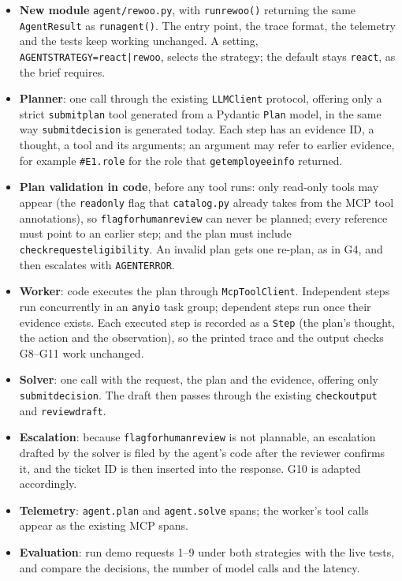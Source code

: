 \documentclass[11pt,letterpaper]{article}
\renewcommand{\_}{\textunderscore\allowbreak}
\begin{document}
\begin{itemize}
  \item \textbf{New module} \texttt{agent/rewoo.py}, with \texttt{run\_rewoo()} returning the same
  \texttt{AgentResult} as \texttt{run\_agent()}. The entry point, the trace format, the telemetry
  and the tests keep working unchanged. A setting, \texttt{AGENT\_STRATEGY=react|rewoo}, selects
  the strategy; the default stays \texttt{react}, as the brief requires.
  \item \textbf{Planner}: one call through the existing \texttt{LLMClient} protocol, offering only
  a strict \texttt{submit\_plan} tool generated from a Pydantic \texttt{Plan} model, in the same way
  \texttt{submit\_decision} is generated today. Each step has an evidence ID, a thought, a tool
  and its arguments; an argument may refer to earlier evidence, for example
  \texttt{\#E1.role} for the role that \texttt{get\_employee\_info} returned.
  \item \textbf{Plan validation in code}, before any tool runs: only read-only tools may appear
  (the \texttt{read\_only} flag that \texttt{catalog.py} already takes from the MCP tool
  annotations), so \texttt{flag\_for\_human\_review} can never be planned; every reference must
  point to an earlier step; and the plan must include \texttt{check\_request\_eligibility}. An
  invalid plan gets one re-plan, as in G4, and then escalates with \texttt{AGENT\_ERROR}.
  \item \textbf{Worker}: code executes the plan through \texttt{McpToolClient}. Independent steps
  run concurrently in an \texttt{anyio} task group; dependent steps run once their evidence
  exists. Each executed step is recorded as a \texttt{Step} (the plan's thought, the action and
  the observation), so the printed trace and the output checks G8--G11 work unchanged.
  \item \textbf{Solver}: one call with the request, the plan and the evidence, offering only
  \texttt{submit\_decision}. The draft then passes through the existing \texttt{check\_output}
  and \texttt{review\_draft}.
  \item \textbf{Escalation}: because \texttt{flag\_for\_human\_review} is not plannable, an
  escalation drafted by the solver is filed by the agent's code after the reviewer confirms it,
  and the ticket ID is then inserted into the response. G10 is adapted accordingly.
  \item \textbf{Telemetry}: \texttt{agent.plan} and \texttt{agent.solve} spans; the worker's tool
  calls appear as the existing MCP spans.
  \item \textbf{Evaluation}: run demo requests 1--9 under both strategies with the live tests,
  and compare the decisions, the number of model calls and the latency.
\end{itemize}
\end{document}
